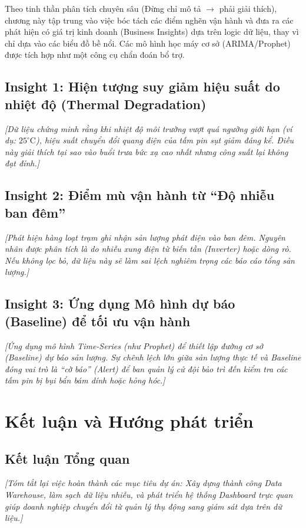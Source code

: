 \documentclass[12pt, a4paper]{report}
\begin{document}
Theo tinh thần phân tích chuyên sâu (Đừng chỉ mô tả $\rightarrow$ phải giải thích), chương này tập trung vào việc bóc tách các điểm nghẽn vận hành và đưa ra các phát hiện có giá trị kinh doanh (Business Insights) dựa trên logic dữ liệu, thay vì chỉ dựa vào các biểu đồ bề nổi. Các mô hình học máy cơ sở (ARIMA/Prophet) được tích hợp như một công cụ chẩn đoán bổ trợ.

\section{Insight 1: Hiện tượng suy giảm hiệu suất do nhiệt độ (Thermal Degradation)}
\textit{[Dữ liệu chứng minh rằng khi nhiệt độ môi trường vượt quá ngưỡng giới hạn (ví dụ: $25^\circ\text{C}$), hiệu suất chuyển đổi quang điện của tấm pin sụt giảm đáng kể. Điều này giải thích tại sao vào buổi trưa bức xạ cao nhất nhưng công suất lại không đạt đỉnh.]}

\section{Insight 2: Điểm mù vận hành từ ``Độ nhiễu ban đêm''}
\textit{[Phát hiện hàng loạt trạm ghi nhận sản lượng phát điện vào ban đêm. Nguyên nhân được phân tích là do nhiễu xung điện từ biến tần (Inverter) hoặc dòng rò. Nếu không lọc bỏ, dữ liệu này sẽ làm sai lệch nghiêm trọng các báo cáo tổng sản lượng.]}

\section{Insight 3: Ứng dụng Mô hình dự báo (Baseline) để tối ưu vận hành}
\textit{[Ứng dụng mô hình Time-Series (như Prophet) để thiết lập đường cơ sở (Baseline) dự báo sản lượng. Sự chênh lệch lớn giữa sản lượng thực tế và Baseline đóng vai trò là ``cờ báo'' (Alert) để ban quản lý cử đội bảo trì đến kiểm tra các tấm pin bị bụi bẩn bám dính hoặc hỏng hóc.]}


\chapter{Kết luận và Hướng phát triển}
\label{chap:conclusion}

\section{Kết luận Tổng quan}
\label{sec:conclusion}
\textit{[Tóm tắt lại việc hoàn thành các mục tiêu dự án: Xây dựng thành công Data Warehouse, làm sạch dữ liệu nhiễu, và phát triển hệ thống Dashboard trực quan giúp doanh nghiệp chuyển đổi từ quản lý thụ động sang giám sát dựa trên dữ liệu.]}
\end{document}
